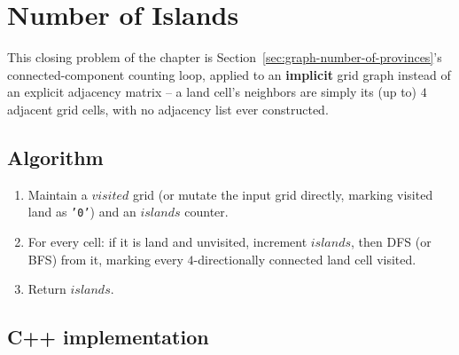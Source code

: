 \section{Number of Islands}
\label{sec:graph-number-of-islands}


\begin{patternbox}
This closing problem of the chapter is
Section~\ref{sec:graph-number-of-provinces}'s connected-component
counting loop, applied to an \textbf{implicit} grid graph instead of an
explicit adjacency matrix -- a land cell's neighbors are simply its
(up to) $4$ adjacent grid cells, with no adjacency list ever
constructed.
\end{patternbox}

\subsection*{Algorithm}

\begin{enumerate}
  \item Maintain a $\textit{visited}$ grid (or mutate the input grid
        directly, marking visited land as \texttt{'0'}) and an
        $\textit{islands}$ counter.
  \item For every cell: if it is land and unvisited, increment
        $\textit{islands}$, then DFS (or BFS) from it, marking every
        $4$-directionally connected land cell visited.
  \item Return $\textit{islands}$.
\end{enumerate}

\subsection*{C++ implementation}

